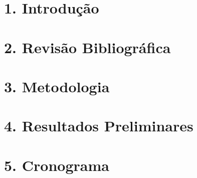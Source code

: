 \documentclass[12pt, a4paper]{report}
\begin{document}
\capa
\folhaderosto
\folhadeaprovacao

\resumo{}
\resumolinguaestrangeira{}
\listadefiguras

%



\sumario

\onehalfspacing		%

\pagestyle{myheadings}


\setcounter{page}{11}
\chapter[Introdução]{1. Introdução}


\chapter[Revisão Bibliográfica]{2. Revisão Bibliográfica}


\chapter[Metodologia]{3. Metodologia}


\chapter[Resultados Preliminares]{4. Resultados Preliminares}


\chapter[Cronograma]{5. Cronograma}



%
%
%







\end{document}
